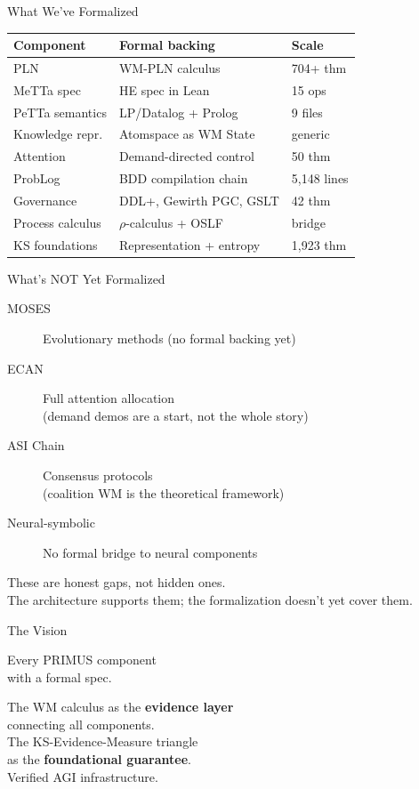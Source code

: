 \documentclass[aspectratio=169,11pt]{beamer}
\begin{document}
\begin{frame}{What We've Formalized}
{\small
\begin{tabular}{lll}
\toprule
\textbf{Component} & \textbf{Formal backing} & \textbf{Scale} \\
\midrule
PLN & WM-PLN calculus & 704+ thm \\
MeTTa spec & HE spec in Lean & 15 ops \\
PeTTa semantics & LP/Datalog + Prolog & 9 files \\
Knowledge repr. & Atomspace as WM State & generic \\
Attention & Demand-directed control & 50 thm \\
ProbLog & BDD compilation chain & 5,148 lines \\
Governance & DDL+, Gewirth PGC, GSLT & 42 thm \\
Process calculus & $\rho$-calculus + OSLF & bridge \\
KS foundations & Representation + entropy & 1,923 thm \\
\bottomrule
\end{tabular}}
\end{frame}

\begin{frame}{What's NOT Yet Formalized}
\begin{description}
\item[MOSES] Evolutionary methods (no formal backing yet)
\item[ECAN] Full attention allocation\\
  (demand demos are a start, not the whole story)
\item[ASI Chain] Consensus protocols\\
  (coalition WM is the theoretical framework)
\item[Neural-symbolic] No formal bridge to neural components
\end{description}

\bigskip
These are \alert{honest gaps}, not hidden ones.\\
The architecture supports them; the formalization doesn't yet cover them.
\end{frame}

\begin{frame}{The Vision}
\begin{center}
\Large
Every PRIMUS component\\
with a \alert{formal spec}.
\end{center}

\bigskip
\begin{center}
The WM calculus as the \textbf{evidence layer}\\
connecting all components.\\[6pt]
The KS-Evidence-Measure triangle\\
as the \textbf{foundational guarantee}.\\[6pt]
Verified AGI infrastructure.
\end{center}
\end{frame}
\end{document}
